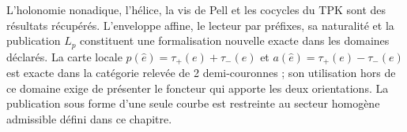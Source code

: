 \begin{statusbox}[title={Hypothèses, domaine et portée du théorème}]
L'holonomie nonadique, l'hélice, la vis de Pell et les cocycles du TPK sont des résultats récupérés. L'enveloppe affine, le lecteur par préfixes, sa naturalité et la publication \(L_p\) constituent une formalisation nouvelle exacte dans les domaines déclarés. La carte locale \(p(\widehat e)=\tau_+(e)+\tau_-(e)\) et \(a(\widehat e)=\tau_+(e)-\tau_-(e)\) est exacte dans la catégorie relevée de 2 demi-couronnes ; son utilisation hors de ce domaine exige de présenter le foncteur qui apporte les deux orientations. La publication sous forme d'une seule courbe est restreinte au secteur homogène admissible défini dans ce chapitre.
\end{statusbox}
